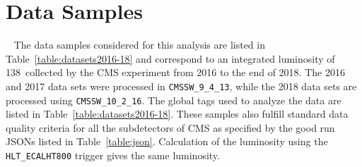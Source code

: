 \section{Data Samples}~\label{Data samples}
The data samples considered for this analysis are listed in Table~\ref{table:datasets2016-18} and correspond to an integrated luminosity of 138~\fbinv collected by the CMS experiment from 2016 to the end of 2018. The 2016 and 2017 data sets were processed in {\tt CMSSW\_9\_4\_13}, while the 2018 data sets are processed using {\tt CMSSW\_10\_2\_16}. The global tags used to analyze the data are listed in Table~\ref{table:datasets2016-18}. These samples also fulfill standard data quality criteria for all the subdetectors of CMS as specified by the good run JSONs listed in Table~\ref{table:json}. Calculation of the luminosity using the \texttt{HLT\_ECALHT800} trigger gives the same luminosity.


